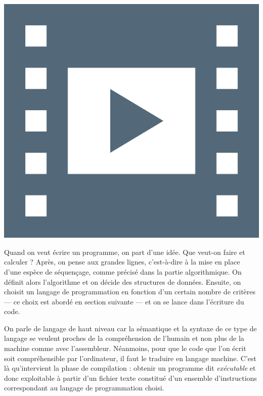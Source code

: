 \begin{marginvideo}
	[\label{vid:VI.6}Langages et compilation.]%
	\href{https://www.youtube.com/watch?v=GO_vkTaUDRg}%
	  {\includegraphics[width=\marginparwidth]{./Images/Pictograms/film-strip-dark-electric-blue.png}}%
\end{marginvideo}

Quand on veut écrire un programme, on part d'une idée. Que veut-on faire et calculer ? Après, on pense aux grandes 
lignes, c'est-à-dire à la mise en place d'une espèce de séquençage, comme précisé dans la partie algorithmique. On définit alors l'algorithme et on décide des structures de données. Ensuite, on choisit un langage de programmation en fonction d'un certain nombre de critères --- ce choix est abordé en section suivante --- et on se lance dans l'écriture du code. 

On parle de langage de haut niveau car la sémantique et la syntaxe de ce type de langage se veulent proches de la compréhension de l'humain et non plus de la machine comme avec l'assembleur. Néanmoins, pour que le code que l'on écrit soit compréhensible par l'ordinateur, il faut le traduire en langage machine. C'est là qu'intervient la phase de compilation : obtenir un programme dit \emph{exécutable} et donc exploitable à partir d'un fichier texte constitué d'un ensemble d'instructions correspondant au langage de programmation choisi.

